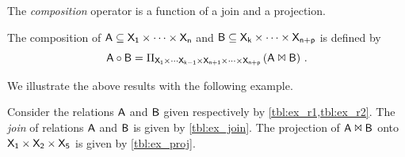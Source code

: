 \documentclass[11pt,final,hidelinks]{article}
\begin{document}
The \emph{composition} operator is a function of a join and a projection.
\begin{definition}
The composition of $\Relation{A} \subseteq \Set{X}[1] \times \cdots \times \Set{X}[n]$ and $\Relation{B} \subseteq \Set{X}[k] \times \cdots \times \Set{X}[n+p]$ is defined by
\begin{equation}
    \Relation{A} \circ \Relation{B} = \Proj_{\Set{X}[1] \times \cdots \Set{X}[k-1] \times \Set{X}[n+1] \times \cdots \times \Set{X}[n+p]}\left(
        \Relation{A} \Join \Relation{B}
    \right)\,.
\end{equation}
\end{definition}

We illustrate the above results with the following example.
\begin{example}
Consider the relations $\Relation{A}$ and $\Relation{B}$ given respectively by \cref{tbl:ex_r1,tbl:ex_r2}. The \emph{join} of relations $\Relation{A}$ and $\Relation{B}$ is given by \cref{tbl:ex_join}. The projection of $\Relation{A} \Join \Relation{B}$ onto $\Set{X}[1] \times \Set{X}[2] \times \Set{X}[5]$ is given by \cref{tbl:ex_proj}.


\end{example}
\end{document}

